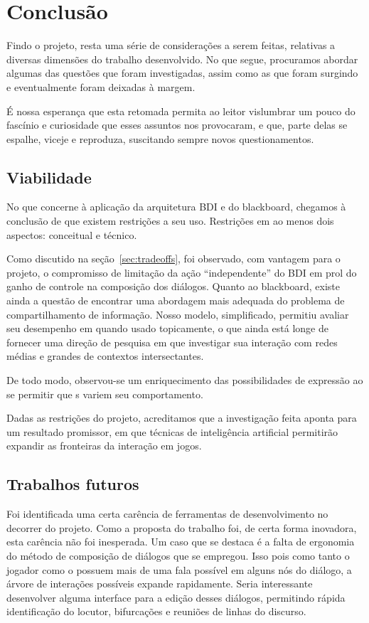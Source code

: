 \chapter{Conclusão}

Findo o projeto, resta uma série de considerações a serem feitas,
relativas a diversas dimensões do trabalho desenvolvido. No que
segue, procuramos abordar algumas das questões que foram investigadas,
assim como as que foram surgindo e eventualmente foram deixadas à
margem.

É nossa esperança que esta retomada permita ao leitor vislumbrar um
pouco do fascínio e curiosidade que esses assuntos nos provocaram, e
que, parte delas se espalhe, viceje e reproduza, suscitando sempre
novos questionamentos.

\section{Viabilidade}

No que concerne à aplicação da arquitetura BDI e do blackboard,
chegamos à conclusão de que existem restrições a seu uso. Restrições
em ao menos dois aspectos: conceitual e técnico.

Como discutido na seção~\ref{sec:tradeoffs}, foi observado, com
vantagem para o projeto, o compromisso de limitação da ação
``independente'' do BDI em prol do ganho de controle na composição dos
diálogos. Quanto ao blackboard, existe ainda a questão de encontrar
uma abordagem mais adequada do problema de compartilhamento de
informação. Nosso modelo, simplificado, permitiu avaliar seu
desempenho em quando usado topicamente, o que ainda está longe de
fornecer uma direção de pesquisa em que investigar sua interação com
redes médias e grandes de contextos intersectantes.

De todo modo, observou-se um enriquecimento das possibilidades de
expressão ao se permitir que \npc{}s variem seu comportamento.

Dadas as restrições do projeto, acreditamos que a investigação feita aponta para um resultado promissor, em que técnicas de inteligência artificial permitirão expandir as fronteiras da interação em jogos.

\section{Trabalhos futuros}

Foi identificada uma certa carência de ferramentas de desenvolvimento no decorrer do projeto.
Como a proposta do trabalho foi, de certa forma inovadora, esta carência não foi inesperada. Um caso que se destaca é a falta de ergonomia do método de composição de diálogos que se empregou. Isso pois como tanto o jogador como o \npc{} possuem mais de uma fala possível em alguns nós do diálogo, a árvore de interações possíveis expande rapidamente. Seria interessante desenvolver alguma interface para a  edição desses diálogos, permitindo rápida identificação do locutor, bifurcações e reuniões de linhas do discurso.

